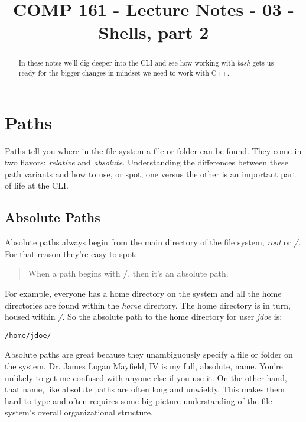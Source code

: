 \documentclass[]{tufte-handout}
\title{COMP 161 - Lecture Notes - 03 - Shells, part 2}
\begin{document}
\maketitle

\begin{abstract}
In these notes we'll dig deeper into  the CLI and see how working with \textit{bash} gets us ready for the bigger changes in mindset we need to work with C++. 
\end{abstract}

\section{Paths}

Paths tell you where in the file system a file or folder can be found. They come in two flavors: \textit{relative} and \textit{absolute}. Understanding the differences between these path variants and how to use, or spot, one versus the other is an important part of life at the CLI.

\subsection{Absolute Paths}

Absolute paths always begin from the main directory of the file system, \textit{root} or \textit{/}.  For that reason they're easy to spot:
\begin{quote}
When a path begins with \textbf{/}, then it's an absolute path. 
\end{quote} 
For example, everyone has a home directory on the system and all the home directories are found within the \textit{home} directory. The home directory is in turn, housed within \textit{/}. So the absolute path to the home directory for user \textit{jdoe} is:
\begin{verbatim}
/home/jdoe/
\end{verbatim}

Absolute paths are great because they unambiguously specify a file or folder on the system. Dr. James Logan Mayfield, IV is my full, absolute, name. You're unlikely to get me confused with anyone else if you use it. On the other hand, that name, like absolute paths are often long and unwieldy. This makes them hard to type and often requires some big picture understanding of the file system's overall organizational structure.  
\end{document}
